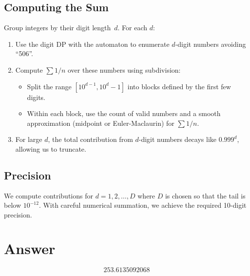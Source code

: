 \documentclass[12pt]{article}
\begin{document}
\subsection{Computing the Sum}
Group integers by their digit length~$d$. For each $d$:
\begin{enumerate}
\item Use the digit DP with the automaton to enumerate $d$-digit numbers avoiding ``506''.
\item Compute $\sum 1/n$ over these numbers using subdivision:
    \begin{itemize}
    \item Split the range $[10^{d-1}, 10^d - 1]$ into blocks defined by the first few digits.
    \item Within each block, use the count of valid numbers and a smooth approximation (midpoint or Euler-Maclaurin) for $\sum 1/n$.
    \end{itemize}
\item For large $d$, the total contribution from $d$-digit numbers decays like $0.999^d$, allowing us to truncate.
\end{enumerate}

\subsection{Precision}
We compute contributions for $d = 1, 2, \ldots, D$ where $D$ is chosen so that the tail is below $10^{-12}$. With careful numerical summation, we achieve the required 10-digit precision.

\section{Answer}

\[
\boxed{253.6135092068}
\]
\end{document}
